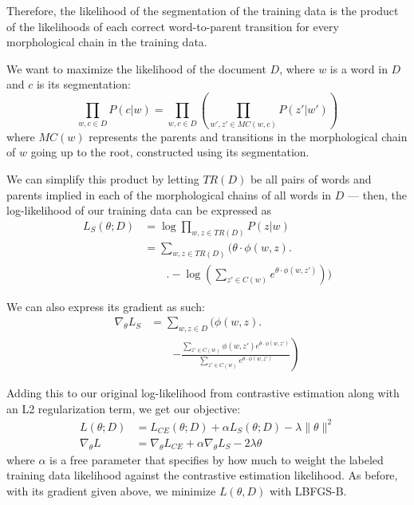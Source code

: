 \documentclass[11pt,twocolumn]{article}
\begin{document}
Therefore, the likelihood of the segmentation of the training data is the product of the likelihoods
of each correct word-to-parent transition for every morphological chain in the training data.

We want to maximize the likelihood of the document $D$, where $w$ is a word in $D$ and $c$ is
its segmentation:
\begin{equation}
    \prod_{w, c \in D} P(c | w) = \prod_{w, c \in D}\left(\prod_{w', z' \in MC(w, c)} P(z' | w')\right)
\end{equation}
where $MC(w)$ represents the parents and transitions in the morphological chain of $w$ going up to the root,
constructed using its segmentation.

We can simplify this product by letting $TR(D)$ be all pairs of words and parents implied in each of
the morphological chains of all words in $D$ ---
then, the log-likelihood of our training data can be expressed as
\begin{equation}
    \begin{split}
        L_S(\theta; D) &= \log{\prod_{w, z \in TR(D)} P(z|w)} \\
                       &= \sum_{w, z \in TR(D)} \Bigg(\theta \cdot \phi(w, z) \Bigg. \\
                       &\qquad\Bigg. - \log\left(\sum_{z' \in C(w)} e^{\theta \cdot \phi(w, z')} \right)\Bigg)
   \end{split}
\end{equation}

We can also express its gradient as such:
\begin{equation}
    \begin{split}
        \nabla_\theta L_S &= \sum_{w, z \in D} \Bigg(\phi(w, z) \Bigg. \\
                          &\qquad\left. - \frac{\sum_{z' \in C(w)} \phi(w, z') e^{\theta \cdot \phi(w, z')} }{\sum_{z' \in C(w)} e^{\theta \cdot \phi(w, z')}}\right)
    \end{split}
\end{equation}

Adding this to our original log-likelihood from contrastive estimation
along with an L2 regularization term, we get our objective:
\begin{equation}
    \begin{split}
        L(\theta; D) &= L_{CE}(\theta; D) + \alpha L_S(\theta; D) - \lambda \| \theta \|^2 \\
        \nabla_\theta L &= \nabla_\theta L_{CE} + \alpha \nabla_\theta L_S - 2\lambda \theta
    \end{split}
\end{equation}
where $\alpha$ is a free parameter that specifies by how much to weight the labeled training data likelihood
against the contrastive estimation likelihood.
As before, with its gradient given above, we minimize $L(\theta, D)$ with LBFGS-B.
\end{document}
